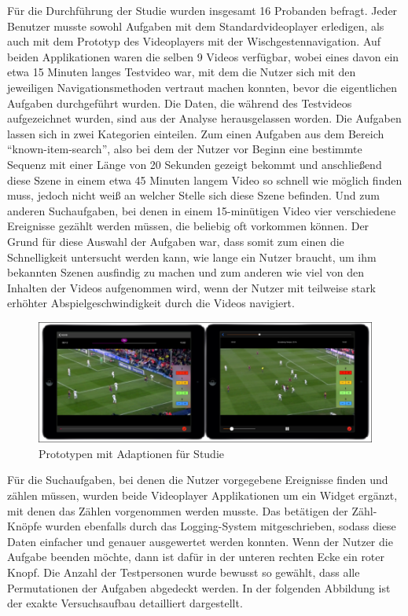\documentclass[11pt,a4paper]{report}
\begin{document}
Für die Durchführung der Studie wurden insgesamt 16 Probanden befragt. Jeder Benutzer musste sowohl Aufgaben mit dem Standardvideoplayer erledigen, als auch mit dem Prototyp des Videoplayers mit der Wischgestennavigation. Auf beiden Applikationen waren die selben 9 Videos verfügbar, wobei eines davon ein etwa 15 Minuten langes Testvideo war, mit dem die Nutzer sich mit den jeweiligen Navigationsmethoden vertraut machen konnten, bevor die eigentlichen Aufgaben durchgeführt wurden. Die Daten, die während des Testvideos aufgezeichnet wurden, sind aus der Analyse herausgelassen worden. Die Aufgaben lassen sich in zwei Kategorien einteilen. Zum einen Aufgaben aus dem Bereich “known-item-search”, also bei dem der Nutzer vor Beginn eine bestimmte Sequenz mit einer Länge von 20 Sekunden gezeigt bekommt und anschließend diese Szene in einem etwa 45 Minuten langem Video so schnell wie möglich finden muss, jedoch nicht weiß an welcher Stelle sich diese Szene befinden. Und zum anderen Suchaufgaben, bei denen in einem 15-minütigen Video vier verschiedene Ereignisse gezählt werden müssen, die beliebig oft vorkommen können. Der Grund für diese Auswahl der Aufgaben war, dass somit zum einen die Schnelligkeit untersucht werden kann, wie lange ein Nutzer braucht, um ihm bekannten Szenen ausfindig zu machen und zum anderen wie viel von den Inhalten der Videos aufgenommen wird, wenn der Nutzer mit teilweise stark erhöhter Abspielgeschwindigkeit durch die Videos navigiert.
\begin{figure}[h]
\begin{center}
\includegraphics[scale=0.9]{./images/31.png}
\caption{Prototypen mit Adaptionen für Studie}
\label{prototyp_flickplayer_studie}
\end{center}
\end{figure}
Für die Suchaufgaben, bei denen die Nutzer vorgegebene Ereignisse finden und zählen müssen, wurden beide Videoplayer Applikationen um ein Widget ergänzt, mit denen das Zählen vorgenommen werden musste. Das betätigen der Zähl-Knöpfe wurden ebenfalls durch das Logging-System mitgeschrieben, sodass diese Daten einfacher und genauer ausgewertet werden konnten. Wenn der Nutzer die Aufgabe beenden möchte, dann ist dafür in der unteren rechten Ecke ein roter Knopf. Die Anzahl der Testpersonen wurde bewusst so gewählt, dass alle Permutationen der Aufgaben abgedeckt werden. In der folgenden Abbildung ist der exakte Versuchsaufbau detailliert dargestellt.
\end{document}
